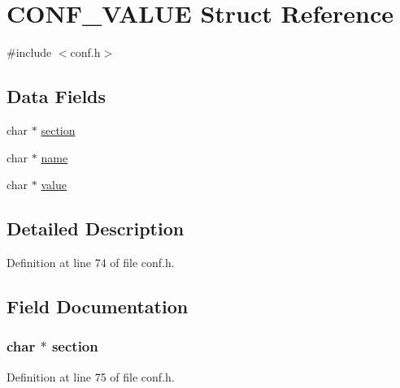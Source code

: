 \hypertarget{struct_c_o_n_f___v_a_l_u_e}{}\section{C\+O\+N\+F\+\_\+\+V\+A\+L\+UE Struct Reference}
\label{struct_c_o_n_f___v_a_l_u_e}


{\ttfamily \#include $<$conf.\+h$>$}

\subsection*{Data Fields}
\begin{DoxyCompactItemize}
\item 
char $\ast$ \hyperlink{struct_c_o_n_f___v_a_l_u_e_a8f787b64195a3ec85f95102bd6824ca0}{section}
\item 
char $\ast$ \hyperlink{struct_c_o_n_f___v_a_l_u_e_ad547fb8186b526cb1b588daad4334fbe}{name}
\item 
char $\ast$ \hyperlink{struct_c_o_n_f___v_a_l_u_e_a325611b97f57f55a57b2a7cf3238ef54}{value}
\end{DoxyCompactItemize}


\subsection{Detailed Description}


Definition at line 74 of file conf.\+h.



\subsection{Field Documentation}
\subsubsection[{\texorpdfstring{section}{section}}]{\setlength{\rightskip}{0pt plus 5cm}char $\ast$ section}\hypertarget{struct_c_o_n_f___v_a_l_u_e_a8f787b64195a3ec85f95102bd6824ca0}{}\label{struct_c_o_n_f___v_a_l_u_e_a8f787b64195a3ec85f95102bd6824ca0}


Definition at line 75 of file conf.\+h.

